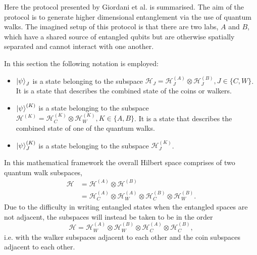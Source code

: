 Here the protocol presented by Giordani et al. \cite{giordani2020} is summarised.
The aim of the protocol is to generate higher dimensional entanglement via the use of quantum walks.
The imagined setup of this protocol is that there are two labs, $A$ and $B$, which have a shared source of entangled qubits but are otherwise spatially separated and cannot interact with one another.

In this section the following notation is employed:
\begin{itemize}
    \item $\ket{\psi}_J$ is a state belonging to the subspace $\mathcal{H}_J = \mathcal{H}^{(A)}_J \otimes \mathcal{H}^{(B)}_J, J\in\{C,W\}$. It is a state that describes the combined state of the coins or walkers.
    \item $\ket{\psi}^{(K)}$ is a state belonging to the subspace $\mathcal{H}^{(K)} = \mathcal{H}^{(K)}_C \otimes \mathcal{H}^{(K)}_W, K\in\{A,B\}$. It is a state that describes the combined state of one of the quantum walks.
    \item  $\ket{\psi}^{(K)}_J$ is a state belonging to the subspace $\mathcal{H}^{(K)}_J$.
\end{itemize}

In this mathematical framework the overall Hilbert space comprises of two quantum walk subspaces,
\begin{align}
    \mathcal{H} &= \mathcal{H}^{(A)} \otimes \mathcal{H}^{(B)}\\
                &= \mathcal{H}^{(A)}_C \otimes \mathcal{H}^{(A)}_W \otimes \mathcal{H}^{(B)}_C \otimes \mathcal{H}^{(B)}_W.
\end{align}
Due to the difficulty in writing entangled states when the entangled spaces are not adjacent, the subspaces will instead be taken to be in the order
\begin{equation}
    \mathcal{H} = \mathcal{H}^{(A)}_W \otimes \mathcal{H}^{(B)}_W \otimes \mathcal{H}^{(A)}_C \otimes \mathcal{H}^{(B)}_C,
\end{equation} 
i.e. with the walker subspaces adjacent to each other and the coin subspaces adjacent to each other.


